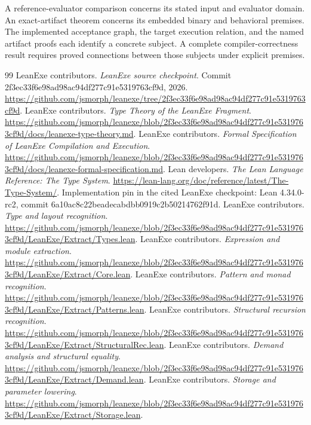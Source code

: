 \documentclass[11pt]{article}
\begin{document}
A reference-evaluator comparison concerns its stated input and evaluator domain.  An exact-artifact theorem concerns its embedded binary and behavioral premises.  The implemented acceptance graph, the target execution relation, and the named artifact proofs each identify a concrete subject.  A complete compiler-correctness result requires proved connections between those subjects under explicit premises.

\begin{thebibliography}{99}
\small
{} LeanExe contributors. \emph{LeanExe source checkpoint}. Commit 2f3ec33f6e98ad98ac94df277c91e5319763cf9d, 2026. \url{https://github.com/jsmorph/leanexe/tree/2f3ec33f6e98ad98ac94df277c91e5319763cf9d}.
 LeanExe contributors. \emph{Type Theory of the LeanExe Fragment}. \url{https://github.com/jsmorph/leanexe/blob/2f3ec33f6e98ad98ac94df277c91e5319763cf9d/docs/leanexe-type-theory.md}.
 LeanExe contributors. \emph{Formal Specification of LeanExe Compilation and Execution}. \url{https://github.com/jsmorph/leanexe/blob/2f3ec33f6e98ad98ac94df277c91e5319763cf9d/docs/leanexe-formal-specification.md}.
 Lean developers. \emph{The Lean Language Reference: The Type System}. \url{https://lean-lang.org/doc/reference/latest/The-Type-System/}. Implementation pin in the cited LeanExe checkpoint: Lean 4.34.0-rc2, commit 6a10ac8c22beadecabdbb0919c2b50214762f91d.
 LeanExe contributors. \emph{Type and layout recognition}. \url{https://github.com/jsmorph/leanexe/blob/2f3ec33f6e98ad98ac94df277c91e5319763cf9d/LeanExe/Extract/Types.lean}.
 LeanExe contributors. \emph{Expression and module extraction}. \url{https://github.com/jsmorph/leanexe/blob/2f3ec33f6e98ad98ac94df277c91e5319763cf9d/LeanExe/Extract/Core.lean}.
 LeanExe contributors. \emph{Pattern and monad recognition}. \url{https://github.com/jsmorph/leanexe/blob/2f3ec33f6e98ad98ac94df277c91e5319763cf9d/LeanExe/Extract/Patterns.lean}.
 LeanExe contributors. \emph{Structural recursion recognition}. \url{https://github.com/jsmorph/leanexe/blob/2f3ec33f6e98ad98ac94df277c91e5319763cf9d/LeanExe/Extract/StructuralRec.lean}.
 LeanExe contributors. \emph{Demand analysis and structural equality}. \url{https://github.com/jsmorph/leanexe/blob/2f3ec33f6e98ad98ac94df277c91e5319763cf9d/LeanExe/Extract/Demand.lean}.
 LeanExe contributors. \emph{Storage and parameter lowering}. \url{https://github.com/jsmorph/leanexe/blob/2f3ec33f6e98ad98ac94df277c91e5319763cf9d/LeanExe/Extract/Storage.lean}.

\end{thebibliography}
\end{document}
